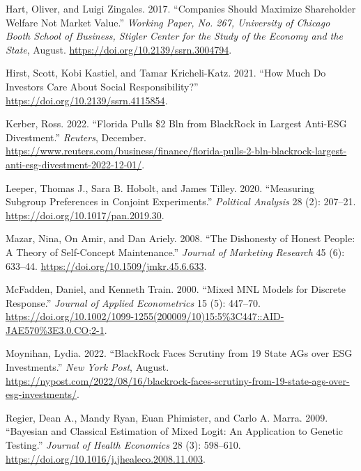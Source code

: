 \documentclass[
  12pt,
]{article}
\newlength{\cslhangindent}
\newlength{\cslentryspacingunit} %
\newenvironment{CSLReferences}[2] %
 {%
  \setlength{\parindent}{0pt}
  \ifodd #1
  \let\oldpar\par
  \def\par{\hangindent=\cslhangindent\oldpar}
  \fi
  \setlength{\parskip}{#2\cslentryspacingunit}
 }%
 {}
\begin{document}
\begin{CSLReferences}{1}{0}
\leavevmode{}%
Hart, Oliver, and Luigi Zingales. 2017. {``Companies Should Maximize Shareholder Welfare Not Market Value.''} \emph{Working Paper, No. 267, University of Chicago Booth School of Business, Stigler Center for the Study of the Economy and the State}, August. \url{https://doi.org/10.2139/ssrn.3004794}.

\leavevmode{}%
Hirst, Scott, Kobi Kastiel, and Tamar Kricheli-Katz. 2021. {``How Much Do Investors Care About Social Responsibility?''} \url{https://doi.org/10.2139/ssrn.4115854}.

\leavevmode{}%
Kerber, Ross. 2022. {``Florida Pulls {\$}2 Bln from BlackRock in Largest Anti-ESG Divestment.''} \emph{Reuters}, December. \url{https://www.reuters.com/business/finance/florida-pulls-2-bln-blackrock-largest-anti-esg-divestment-2022-12-01/}.

\leavevmode{}%
Leeper, Thomas J., Sara B. Hobolt, and James Tilley. 2020. {``Measuring Subgroup Preferences in Conjoint Experiments.''} \emph{Political Analysis} 28 (2): 207--21. \url{https://doi.org/10.1017/pan.2019.30}.

\leavevmode{}%
Mazar, Nina, On Amir, and Dan Ariely. 2008. {``The Dishonesty of Honest People: A Theory of Self-Concept Maintenance.''} \emph{Journal of Marketing Research} 45 (6): 633--44. \url{https://doi.org/10.1509/jmkr.45.6.633}.

\leavevmode{}%
McFadden, Daniel, and Kenneth Train. 2000. {``Mixed MNL Models for Discrete Response.''} \emph{Journal of Applied Econometrics} 15 (5): 447--70. \url{https://doi.org/10.1002/1099-1255(200009/10)15:5\%3C447::AID-JAE570\%3E3.0.CO;2-1}.

\leavevmode{}%
Moynihan, Lydia. 2022. {``BlackRock Faces Scrutiny from 19 State AGs over ESG Investments.''} \emph{New York Post}, August. \url{https://nypost.com/2022/08/16/blackrock-faces-scrutiny-from-19-state-ags-over-esg-investments/}.

\leavevmode{}%
Regier, Dean A., Mandy Ryan, Euan Phimister, and Carlo A. Marra. 2009. {``Bayesian and Classical Estimation of Mixed Logit: An Application to Genetic Testing.''} \emph{Journal of Health Economics} 28 (3): 598--610. \url{https://doi.org/10.1016/j.jhealeco.2008.11.003}.


\end{CSLReferences}
\end{document}

